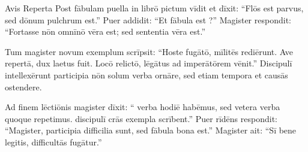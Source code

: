 \documentclass[12pt]{nextbook}
\begin{document}
\begin{readersection}{Avis Reperta}
Post fābulam puella  in librō pictum vīdit et dīxit: “Flōs est parvus, sed dōnum pulchrum est.” Puer addidit: “Et fābula est ?” Magister respondit: “Fortasse nōn omnīnō vēra est; sed sententia vēra est.”

Tum magister novum exemplum scrīpsit: “Hoste fugātō, mīlitēs rediērunt. Ave repertā, dux laetus fuit. Locō relictō, lēgātus ad imperātōrem vēnit.” Discipulī intellexērunt participia nōn solum verba ornāre, sed etiam tempora et causās ostendere.

Ad finem lēctiōnis magister dīxit: “ verba hodiē habēmus, sed vetera verba quoque repetimus.  discipulī crās exempla scrībent.” Puer rīdēns respondit: “Magister, participia difficilia sunt, sed fābula bona est.” Magister ait: “Sī bene legitis, difficultās fugātur.”

\end{readersection}
\end{document}
